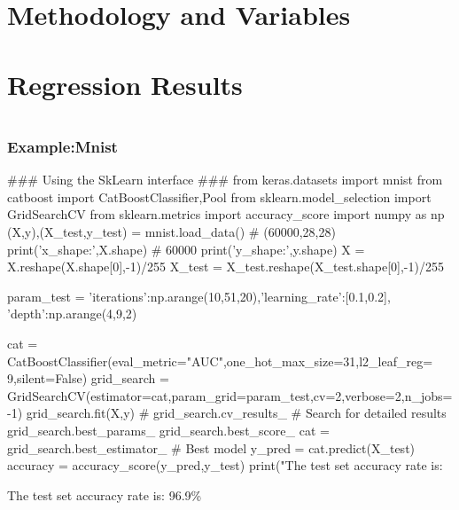 \documentclass[UTF8, aspectratio=169 , 10pt，punct=kaiming]{beamer} %
\begin{document}
\section{Methodology and Variables}



\section{Regression Results}

\section{\appendixname}




\begin{frame}[fragile]
  \frametitle{Example:Mnist}
  \begin{python}
### Using the SkLearn interface ###
from keras.datasets import mnist
from catboost import CatBoostClassifier,Pool
from sklearn.model_selection import GridSearchCV
from sklearn.metrics import accuracy_score
import numpy as np
(X,y),(X_test,y_test) = mnist.load_data()
# (60000,28,28)
print('x_shape:',X.shape)
# 60000
print('y_shape:',y.shape)
X = X.reshape(X.shape[0],-1)/255
X_test = X_test.reshape(X_test.shape[0],-1)/255

param_test = {'iterations':np.arange(10,51,20),'learning_rate':[0.1,0.2],
        'depth':np.arange(4,9,2)}

cat = CatBoostClassifier(eval_metric="AUC",one_hot_max_size=31,l2_leaf_reg= 9,silent=False)
grid_search = GridSearchCV(estimator=cat,param_grid=param_test,cv=2,verbose=2,n_jobs=-1)
grid_search.fit(X,y)
# grid_search.cv_results_  # Search for detailed results
grid_search.best_params_
grid_search.best_score_
cat = grid_search.best_estimator_  # Best model
y_pred = cat.predict(X_test)
accuracy = accuracy_score(y_pred,y_test)
print("The test set accuracy rate is:%
\end{python}
The test set accuracy rate is: 96.9\%
\end{frame}
\end{document}
